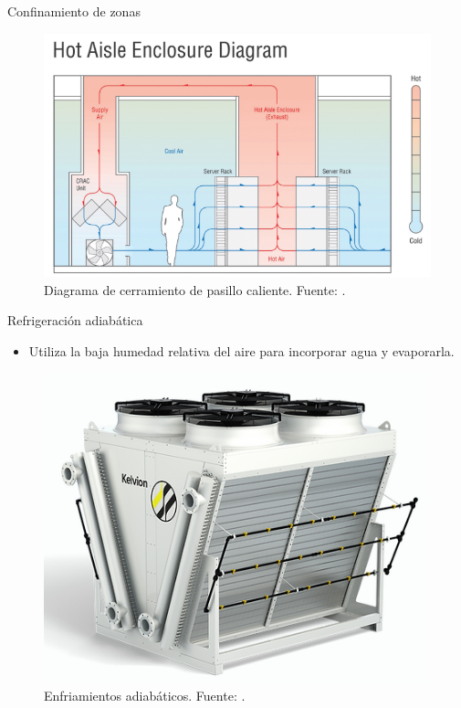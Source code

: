 \documentclass[aspectratio=169, compress]{beamer}
\begin{document}
\begin{frame}{Confinamiento de zonas}
    \begin{figure}
        \begin{center}
            \includegraphics[scale=0.6]{../figures/hot_aisle}
            \caption{Diagrama de cerramiento de pasillo caliente. Fuente: \cite{journal-uptimeinstitute}.}
            \label{hot_aisle}
        \end{center}
    \end{figure}
\end{frame}

\begin{frame}{Refrigeración adiabática}
    \begin{itemize}
        \item Utiliza la baja humedad relativa del aire para incorporar agua y evaporarla.
    \end{itemize}
    \begin{figure}
        \begin{center}
            \includegraphics[scale=0.3]{../figures/adiabatic_coolers}
            \caption{Enfriamientos adiabáticos. Fuente: \cite{Kelvion}.}
            \label{adiabatic_coolers}
        \end{center}
    \end{figure}
\end{frame}
\end{document}
